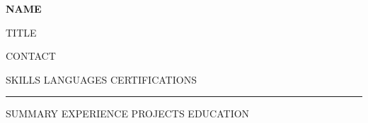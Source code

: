 \documentclass[10pt,a4paper]{article}
\begin{document}
\noindent
\begin{minipage}[t]{0.34\textwidth}%
  \colorbox{sidebg}{%
    \begin{minipage}[t][\dimexpr\textheight-2\fboxsep-0.6pt\relax][t]{\dimexpr\linewidth-2\fboxsep\relax}%
      \color{sidefg}%
      \raggedright
      {\Large\bfseries {{NAME}}}\par
      \vspace{0.2em}%
      {\small\color{sideaccent} {{TITLE}}}\par
      \vspace{0.4em}%
      {\scriptsize {{CONTACT}}}\par
      {{SKILLS}}%
      {{LANGUAGES}}%
      {{CERTIFICATIONS}}%
    \end{minipage}%
  }%
\end{minipage}%
\hfill
\begin{minipage}[t]{0.61\textwidth}%
  {\color{accent}\rule{\textwidth}{2.4pt}}\par
  \vspace{0.4em}%
  {{SUMMARY}}%
  {{EXPERIENCE}}%
  {{PROJECTS}}%
  {{EDUCATION}}%
\end{minipage}
\end{document}
